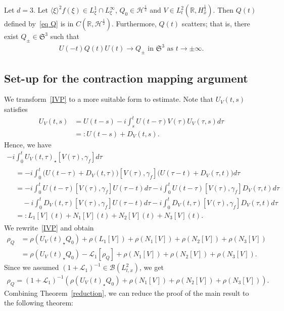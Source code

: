 \documentclass[10pt,a4paper]{amsart}
\newcommand{\BR}{\mathbb{R}}
\newcommand{\CB}{\mathcal{B}}
\newcommand{\CH}{\mathcal{H}}
\newcommand{\CL}{\mathcal{L}}
\newcommand{\FS}{\mathfrak{S}}
\newcommand{\ga}{\gamma}
\newcommand{\ta}{\tau}
\newcommand{\rh}{\rho}
\newcommand{\Br}[1]{\langle #1 \rangle}
\newcommand{\I}{\infty}
\newcommand{\st}{\star}
\newcommand{\R}{\mathbb{R}}
\newcommand{\tw}{\frac{1}{2}}
\begin{document}
\begin{lemm} \label{reduction}
Let $d=3$. Let $\Br{\xi}^2 f(\xi) \in L^1_\xi \cap L^\I_\xi$, $Q_0 \in \CH^\tw$ and $V \in L^2_t(\R,H^\tw_x)$. Then $Q(t)$ defined by~\eqref{eq Q} is in $C(\BR, \CH^\tw)$. Furthermore, $Q(t)$ scatters; that is, there exist $Q_\pm \in \FS^3$ such that
\begin{align}
U(-t)Q(t)U(t) \to Q_\pm \text{ in } \FS^3 \text{ as } t \to \pm \I.
\end{align}
\end{lemm}


\subsection{Set-up for the contraction mapping argument}

We transform~\eqref{IVP} to a more suitable form to estimate. Note that $U_V(t,s)$ satisfies
\begin{equation}
\begin{split}
U_V(t,s) &= U(t-s) -i \int_s^t U(t-\ta) V(\ta) U_V(\ta,s) d\ta \\
&=:U(t-s) + D_V(t,s).
\end{split}
\end{equation}
Hence, we have
\begin{multline}\label{ABCD}
-i\int_0^t U_V(t,\ta)_\st [V(\ta),\ga_f] d\ta \\
\begin{aligned}
&= -i \int_0^t \big(U(t-\ta)+D_V(t,\ta)\big)[V(\ta), \ga_f] \big(U(\ta-t)+D_V(\ta,t)\big)d\ta \\
&= -i \int_0^t U(t-\ta)[V(\ta), \ga_f] U(\ta-t)d\ta -i \int_0^t U(t-\ta)[V(\ta), \ga_f] D_V(\ta,t)d\ta \\
&\quad -i \int_0^t D_V(t,\ta)[V(\ta), \ga_f] U(\ta-t)d\ta -i \int_0^t D_V(t,\ta)[V(\ta), \ga_f] D_V(\ta,t)d\ta \\
& =: L_1[V](t) + N_1[V](t) + N_2[V](t) + N_3[V](t). 
\end{aligned}
\end{multline}
We rewrite~\eqref{IVP} and obtain
\begin{equation}
\begin{split}
\rh_Q &= \rh(U_V(t)_\st Q_0) + \rh(L_1[V])+ \rh(N_1[V])+ \rh(N_2[V])+ \rh(N_3[V]) \\
&= \rh(U_V(t)_\st Q_0) -\CL_1[\rh_Q] + \rh(N_1[V])+ \rh(N_2[V])+ \rh(N_3[V]).
\end{split}
\end{equation}
Since we assumed $(1+\CL_1)^{-1}\in \CB(L^2_{t,x})$, we get
\begin{align}\label{IVP*}
\tag{IVP*}
\rh_Q = (1+\CL_1)^{-1}(\rh(U_V(t)_\st Q_0) +\rh(N_1[V])+ \rh(N_2[V])+ \rh(N_3[V])).
\end{align}
Combining Theorem~\ref{reduction}, we can reduce the proof of the main result to the following theorem:
\end{document}
